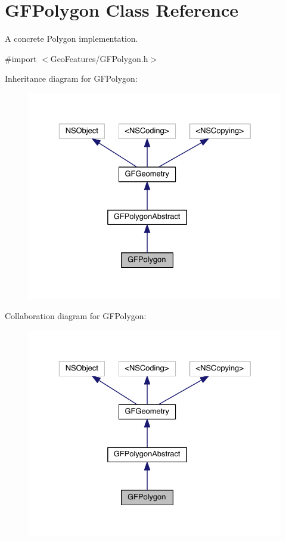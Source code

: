 \hypertarget{interface_g_f_polygon}{}\section{G\+F\+Polygon Class Reference}
\label{interface_g_f_polygon}


A concrete Polygon implementation.  




{\ttfamily \#import $<$Geo\+Features/\+G\+F\+Polygon.\+h$>$}



Inheritance diagram for G\+F\+Polygon\+:\nopagebreak
\begin{figure}[H]
\begin{center}
\leavevmode
\includegraphics[width=329pt]{interface_g_f_polygon__inherit__graph}
\end{center}
\end{figure}


Collaboration diagram for G\+F\+Polygon\+:\nopagebreak
\begin{figure}[H]
\begin{center}
\leavevmode
\includegraphics[width=329pt]{interface_g_f_polygon__coll__graph}
\end{center}
\end{figure}
